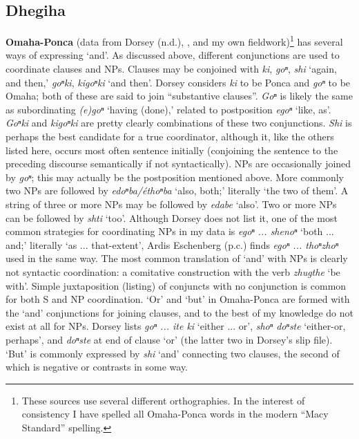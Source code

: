 \documentclass[output=paper]{LSP/langsci}
\begin{document}
\subsection{Dhegiha}
 
\textbf{Omaha-Ponca} (data from Dorsey (n.d.), \citealt{Koontz1984}, \citealt{Rudin2003} and my own fieldwork)\footnote{These sources use several different orthographies. In the interest of consistency I have spelled all Omaha-Ponca words in the modern ``Macy Standard'' spelling.} has several ways of expressing `and'. As discussed above, different conjunctions are used to coordinate clauses and NPs. Clauses may be conjoined with \textit{ki}, \textit{goⁿ}, \textit{shi} `again, and then,' \textit{goⁿki}, \textit{kigoⁿki} `and then'. Dorsey considers \textit{ki} to be Ponca and \textit{goⁿ} to be Omaha; both of these are said to join ``substantive clauses''. \textit{Goⁿ} is likely the same as subordinating \textit{(e)goⁿ} `having (done),' related to postposition \textit{egoⁿ} `like, as'. \textit{Goⁿki} and \textit{kigoⁿki} are pretty clearly combinations of these two conjunctions. \textit{Shi} is perhaps the best candidate for a true coordinator, although it, like the others listed here, occurs most often sentence initially (conjoining the sentence to the preceding discourse semantically if not syntactically). NPs are occasionally joined by \textit{goⁿ}; this may actually be the postposition mentioned above. More commonly two NPs are followed by \textit{edoⁿba/\'ethoⁿba} `also, both;' literally `the two of them'. A string of three or more NPs may be followed by \textit{edabe} `also'. Two or more NPs can be followed by \textit{shti} `too'. Although Dorsey does not list it, one of the most common strategies for coordinating NPs in my data is \textit{egoⁿ ... shenoⁿ} `both ... and;' literally `as ... that-extent', Ardis Eschenberg (p.c.) finds \textit{egoⁿ ... thoⁿzhoⁿ} used in the same way. The most common translation of `and' with NPs is clearly not syntactic coordination: a comitative construction with the verb \textit{zhugthe} `be with'. Simple juxtaposition (listing) of conjuncts with no conjunction is common for both S and NP coordination. `Or' and `but' in Omaha-Ponca are formed with the `and' conjunctions for joining clauses, and to the best of my knowledge do not exist at all for NPs. Dorsey lists \textit{goⁿ ... ite ki} `either ... or', \textit{shoⁿ doⁿste} `either-or, perhaps', and \textit{doⁿste} at end of clause `or' (the latter two in Dorsey's slip file). `But' is commonly expressed by \textit{shi} `and' connecting two clauses, the second of which is negative or contrasts in some way.
\end{document}
